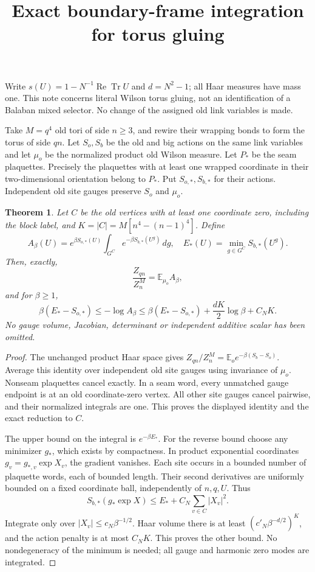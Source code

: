 \documentclass{article}
\title{Exact boundary-frame integration for torus gluing}\author{}\date{}
\newtheorem{theorem}{Theorem}
\begin{document}
\maketitle
Write $s(U)=1-N^{-1}\operatorname{Re}\operatorname{Tr}U$ and $d=N^2-1$; all Haar measures have mass one. This note concerns literal Wilson torus gluing, not an identification of a Balaban mixed selector. No change of the assigned old link variables is made.

Take $M=q^4$ old tori of side $n\ge3$, and rewire their wrapping bonds to form the torus of side $qn$. Let $S_o,S_b$ be the old and big actions on the same link variables and let $\mu_o$ be the normalized product old Wilson measure. Let $P_*$ be the seam plaquettes. Precisely the plaquettes with at least one wrapped coordinate in their two-dimensional orientation belong to $P_*$. Put $S_{o,*},S_{b,*}$ for their actions. Independent old site gauges preserve $S_o$ and $\mu_o$.

\begin{theorem}
Let $C$ be the old vertices with at least one coordinate zero, including the block label, and $K=|C|=M[n^4-(n-1)^4]$. Define
\[
 A_\beta(U)=e^{\beta S_{o,*}(U)}\int_{G^C}e^{-\beta S_{b,*}(U^g)}\,dg,
 \quad E_*(U)=\min_{g\in G^C}S_{b,*}(U^g).
\]
Then, exactly,
\[
 \frac{Z_{qn}}{Z_n^M}=\mathbb E_{\mu_o} A_\beta,
\]
and for $\beta\ge1$,
\[
 \beta(E_*-S_{o,*})\le-\log A_\beta
 \le\beta(E_*-S_{o,*})+\frac{dK}{2}\log\beta+C_N K.
\]
No gauge volume, Jacobian, determinant or independent additive scalar has been omitted.
\end{theorem}
\begin{proof}
The unchanged product Haar space gives $Z_{qn}/Z_n^M=\mathbb E_o e^{-\beta(S_b-S_o)}$. Average this identity over independent old site gauges using invariance of $\mu_o$. Nonseam plaquettes cancel exactly. In a seam word, every unmatched gauge endpoint is at an old coordinate-zero vertex. All other site gauges cancel pairwise, and their normalized integrals are one. This proves the displayed identity and the exact reduction to $C$.

The upper bound on the integral is $e^{-\beta E_*}$. For the reverse bound choose any minimizer $g_*$, which exists by compactness. In product exponential coordinates $g_v=g_{*,v}\exp X_v$, the gradient vanishes. Each site occurs in a bounded number of plaquette words, each of bounded length. Their second derivatives are uniformly bounded on a fixed coordinate ball, independently of $n,q,U$. Thus
\[
 S_{b,*}(g_*\exp X)\le E_*+C_N\sum_{v\in C}|X_v|^2.
\]
Integrate only over $|X_v|\le c_N\beta^{-1/2}$. Haar volume there is at least $(c'_N\beta^{-d/2})^K$, and the action penalty is at most $C_NK$. This proves the other bound. No nondegeneracy of the minimum is needed; all gauge and harmonic zero modes are integrated.
\end{proof}
\end{document}
